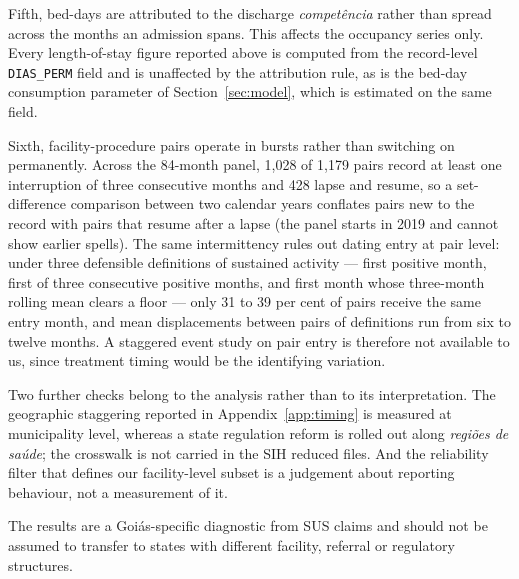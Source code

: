 Fifth, bed-days are attributed to the discharge \emph{compet\^encia} rather than
spread across the months an admission spans. This affects the occupancy series
only. Every length-of-stay figure reported above is computed from the
record-level \texttt{DIAS\_PERM} field and is unaffected by the attribution rule,
as is the bed-day consumption parameter of Section~\ref{sec:model}, which is
estimated on the same field.

Sixth, facility-procedure pairs operate in bursts rather than switching on
permanently. Across the 84-month panel, 1{,}028 of 1{,}179 pairs record at least
one interruption of three consecutive months and 428 lapse and resume, so a
set-difference comparison between two calendar years conflates pairs new to the
record with pairs that resume after a lapse (the panel starts in 2019 and cannot show earlier spells). The same intermittency rules out dating entry at pair level: under
three defensible definitions of sustained activity --- first positive month,
first of three consecutive positive months, and first month whose three-month
rolling mean clears a floor --- only 31 to 39 per cent of pairs receive the same
entry month, and mean displacements between pairs of definitions run from six to twelve months. A staggered event study
on pair entry is therefore not available to us, since treatment timing would be
the identifying variation.

Two further checks belong to the analysis rather than to its interpretation. The geographic staggering reported in Appendix~\ref{app:timing} is measured at municipality level, whereas a
state regulation reform is rolled out along \emph{regi\~oes de sa\'ude}; the
crosswalk is not carried in the SIH reduced files. And the reliability filter
that defines our facility-level subset is a judgement about reporting behaviour,
not a measurement of it.

The results are a Goi\'as-specific diagnostic from SUS claims and should not be assumed to transfer to states with different facility, referral or regulatory structures.
